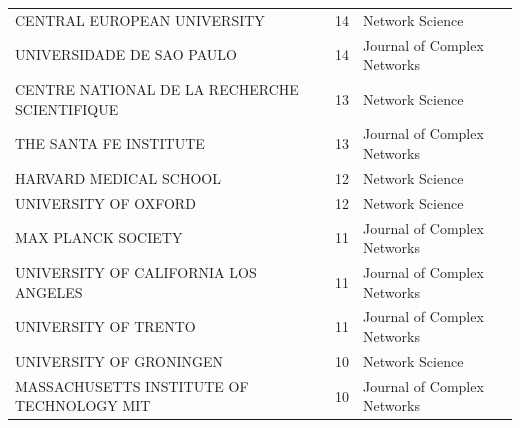 \documentclass[twocolumn]{article}
\begin{document}
\begin{table}[htbp]
{\begin{tabular}{lcl}
				CENTRAL EUROPEAN UNIVERSITY                   & 14 & Network Science \\
				UNIVERSIDADE DE SAO PAULO                     & 14 & Journal of Complex Networks \\
				CENTRE NATIONAL DE LA RECHERCHE SCIENTIFIQUE  & 13 & Network Science \\
				THE SANTA FE INSTITUTE                        & 13 & Journal of Complex Networks \\
				HARVARD MEDICAL SCHOOL                        & 12 & Network Science \\
				UNIVERSITY OF OXFORD                          & 12 & Network Science \\
				MAX PLANCK SOCIETY                            & 11 & Journal of Complex Networks \\
				UNIVERSITY OF CALIFORNIA LOS ANGELES          & 11 & Journal of Complex Networks \\
				UNIVERSITY OF TRENTO                          & 11 & Journal of Complex Networks \\
				UNIVERSITY OF GRONINGEN                       & 10 & Network Science \\
				MASSACHUSETTS INSTITUTE OF TECHNOLOGY MIT     & 10 & Journal of Complex Networks \\
				\bottomrule
		\end{tabular}}
	\end{table}

	
	
	
	
	
\end{document}
